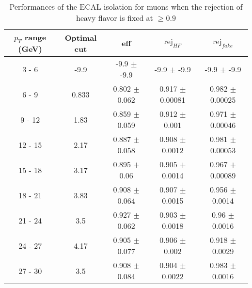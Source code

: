 \begin{table}[htbp]
   \centering
   \begin{tabular}{|c|c|c|c|c|}
      \hline
      $p_T$ range (GeV) & Optimal cut & eff & $\textrm{rej}_{HF}$ & $\textrm{rej}_{fake}$ \\
      \hline
      3 - 6 & -9.9 & -9.9 $\pm$ -9.9 & -9.9 $\pm$ -9.9 & -9.9 $\pm$ -9.9 \\
      \hline
      6 - 9 & 0.833 & 0.802 $\pm$ 0.062 & 0.917 $\pm$ 0.00081 & 0.982 $\pm$ 0.00025 \\
      \hline
      9 - 12 & 1.83 & 0.859 $\pm$ 0.059 & 0.912 $\pm$ 0.001 & 0.971 $\pm$ 0.00046 \\
      \hline
      12 - 15 & 2.17 & 0.887 $\pm$ 0.058 & 0.908 $\pm$ 0.0012 & 0.981 $\pm$ 0.00053 \\
      \hline
      15 - 18 & 3.17 & 0.895 $\pm$ 0.06 & 0.905 $\pm$ 0.0014 & 0.967 $\pm$ 0.00089 \\
      \hline
      18 - 21 & 3.83 & 0.908 $\pm$ 0.064 & 0.907 $\pm$ 0.0015 & 0.956 $\pm$ 0.0014 \\
      \hline
      21 - 24 & 3.5 & 0.927 $\pm$ 0.062 & 0.903 $\pm$ 0.0018 & 0.96 $\pm$ 0.0016 \\
      \hline
      24 - 27 & 4.17 & 0.905 $\pm$ 0.077 & 0.906 $\pm$ 0.002 & 0.918 $\pm$ 0.0029 \\
      \hline
      27 - 30 & 3.5 & 0.908 $\pm$ 0.084 & 0.904 $\pm$ 0.0022 & 0.983 $\pm$ 0.0016 \\
      \hline
   \end{tabular}
   \caption{\small{Performances of the ECAL isolation for muons when the rejection of heavy flavor is fixed at $\geq 0.9$}\label{tab:ecal_muon_pureHf}}
\end{table}






